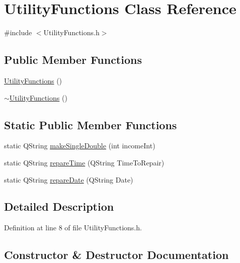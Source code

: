 \hypertarget{classUtilityFunctions}{}\section{Utility\+Functions Class Reference}
\label{classUtilityFunctions}


{\ttfamily \#include $<$Utility\+Functions.\+h$>$}

\subsection*{Public Member Functions}
\begin{DoxyCompactItemize}
\item 
\hyperlink{classUtilityFunctions_aa66aa28b5c3ee83f8cf14ec56f841443}{Utility\+Functions} ()
\item 
\hyperlink{classUtilityFunctions_ab92ca1da946cc58713f6d06a4bcd0ff6}{$\sim$\+Utility\+Functions} ()
\end{DoxyCompactItemize}
\subsection*{Static Public Member Functions}
\begin{DoxyCompactItemize}
\item 
static Q\+String \hyperlink{classUtilityFunctions_a9decf9e823f96af31a5dac497f2c68d2}{make\+Single\+Double} (int income\+Int)
\item 
static Q\+String \hyperlink{classUtilityFunctions_ac2212f463b34781025e9e0bcfeaad3eb}{repare\+Time} (Q\+String Time\+To\+Repair)
\item 
static Q\+String \hyperlink{classUtilityFunctions_a11f16049e57928c6a74aba7438f66841}{repare\+Date} (Q\+String Date)
\end{DoxyCompactItemize}


\subsection{Detailed Description}


Definition at line 8 of file Utility\+Functions.\+h.



\subsection{Constructor \& Destructor Documentation}
\hypertarget{classUtilityFunctions_aa66aa28b5c3ee83f8cf14ec56f841443}{}\label{classUtilityFunctions_aa66aa28b5c3ee83f8cf14ec56f841443} 
